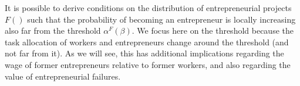 \documentclass[12pt,american]{paper}
\theoremstyle{remark}
\begin{document}

It is possible to derive conditions on the distribution of entrepreneurial projects $F()$ such that the probability of becoming an entrepreneur is locally increasing also far from the threshold $\alpha^F(\beta)$. We focus here on the  threshold because the task allocation of workers and entrepreneurs change around the threshold (and not far from it). As we will see, this has additional implications regarding the wage of former entrepreneurs relative to former workers, and also regarding the value of entrepreneurial failures. 
\end{document}
